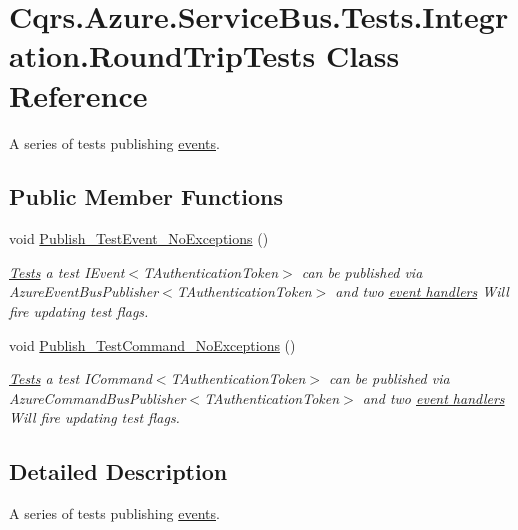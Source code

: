 \hypertarget{classCqrs_1_1Azure_1_1ServiceBus_1_1Tests_1_1Integration_1_1RoundTripTests}{}\section{Cqrs.\+Azure.\+Service\+Bus.\+Tests.\+Integration.\+Round\+Trip\+Tests Class Reference}
\label{classCqrs_1_1Azure_1_1ServiceBus_1_1Tests_1_1Integration_1_1RoundTripTests}


A series of tests publishing \hyperlink{}{events}.  


\subsection*{Public Member Functions}
\begin{DoxyCompactItemize}
\item 
void \hyperlink{classCqrs_1_1Azure_1_1ServiceBus_1_1Tests_1_1Integration_1_1RoundTripTests_a35eab43e8a250d844db0d3f5931394ae_a35eab43e8a250d844db0d3f5931394ae}{Publish\+\_\+\+Test\+Event\+\_\+\+No\+Exceptions} ()
\begin{DoxyCompactList}\small\item\em \hyperlink{namespaceCqrs_1_1Azure_1_1ServiceBus_1_1Tests}{Tests} a test I\+Event$<$\+T\+Authentication\+Token$>$ can be published via Azure\+Event\+Bus\+Publisher$<$\+T\+Authentication\+Token$>$ and two \hyperlink{}{event handlers} Will fire updating test flags. \end{DoxyCompactList}\item 
void \hyperlink{classCqrs_1_1Azure_1_1ServiceBus_1_1Tests_1_1Integration_1_1RoundTripTests_a5f10c6d0a447991a5d689f17f54a87e5_a5f10c6d0a447991a5d689f17f54a87e5}{Publish\+\_\+\+Test\+Command\+\_\+\+No\+Exceptions} ()
\begin{DoxyCompactList}\small\item\em \hyperlink{namespaceCqrs_1_1Azure_1_1ServiceBus_1_1Tests}{Tests} a test I\+Command$<$\+T\+Authentication\+Token$>$ can be published via Azure\+Command\+Bus\+Publisher$<$\+T\+Authentication\+Token$>$ and two \hyperlink{}{event handlers} Will fire updating test flags. \end{DoxyCompactList}\end{DoxyCompactItemize}


\subsection{Detailed Description}
A series of tests publishing \hyperlink{}{events}. 



